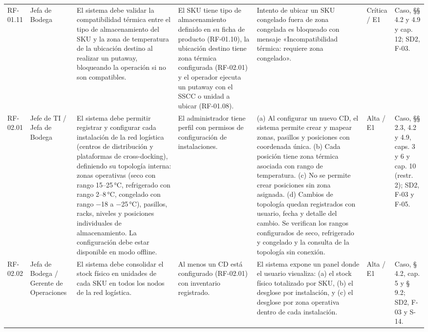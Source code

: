 {\begin{longtable}{@{}F{0.062} F{0.080} F{0.195} F{0.160} F{0.240} F{0.093} F{0.170}@{}}
  RF-01.11 & Jefa de Bodega & El sistema debe validar la compatibilidad térmica entre el tipo de almacenamiento del SKU y la zona de temperatura de la ubicación destino al realizar un putaway, bloqueando la operación si no son compatibles. & El SKU tiene tipo de almacenamiento definido en su ficha de producto (RF-01.10), la ubicación destino tiene zona térmica configurada (RF-02.01) y el operador ejecuta un putaway con el SSCC o unidad a ubicar (RF-01.08). & Intento de ubicar un SKU congelado fuera de zona congelada es bloqueado con mensaje «Incompatibilidad térmica: requiere zona congelado». & Crítica / E1 & Caso, §§ 4.2 y 4.9 y cap. 12; SD2, F-03. \\
  RF-02.01 & Jefe de TI / Jefa de Bodega & El sistema debe permitir registrar y configurar cada instalación de la red logística (centros de distribución y plataformas de cross-docking), definiendo su topología interna: zonas operativas (seco con rango 15–25\,°C, refrigerado con rango 2–8\,°C, congelado con rango $-$18 a $-$25\,°C), pasillos, racks, niveles y posiciones individuales de almacenamiento. La configuración debe estar disponible en modo offline. & El administrador tiene perfil con permisos de configuración de instalaciones. & (a) Al configurar un nuevo CD, el sistema permite crear y mapear zonas, pasillos y posiciones con coordenada única. (b) Cada posición tiene zona térmica asociada con rango de temperatura. (c) No se permite crear posiciones sin zona asignada. (d) Cambios de topología quedan registrados con usuario, fecha y detalle del cambio. Se verifican los rangos configurados de seco, refrigerado y congelado y la consulta de la topología sin conexión. & Alta / E1 & Caso, §§ 2.3, 4.2 y 4.9, caps. 3 y 6 y cap. 10 (restr. 2); SD2, F-03 y F-05. \\
  RF-02.02 & Jefa de Bodega / Gerente de Operaciones & El sistema debe consolidar el stock físico en unidades de cada SKU en todos los nodos de la red logística. & Al menos un CD está configurado (RF-02.01) con inventario registrado. & El sistema expone un panel donde el usuario visualiza: (a) el stock físico totalizado por SKU, (b) el desglose por instalación, y (c) el desglose por zona operativa dentro de cada instalación. & Alta / E1 & Caso, § 4.2, cap. 5 y § 9.2; SD2, F-03 y S-14. \\

\end{longtable}}
